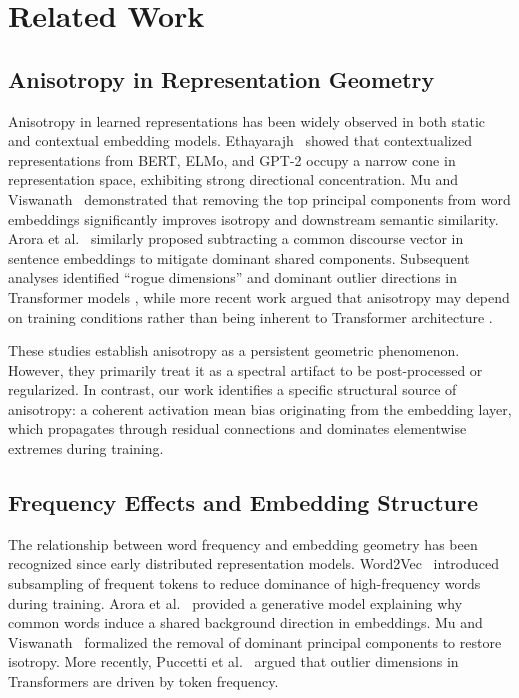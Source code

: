 \section{Related Work}

\subsection{Anisotropy in Representation Geometry}

Anisotropy in learned representations has been widely observed in both static
and contextual embedding models.
Ethayarajh~\cite{ethayarajh2019contextual} showed that contextualized
representations from BERT, ELMo, and GPT-2 occupy a narrow cone in
representation space, exhibiting strong directional concentration.
Mu and Viswanath~\cite{mu2018all,mu2017allbutthetop} demonstrated that
removing the top principal components from word embeddings significantly
improves isotropy and downstream semantic similarity.
Arora et al.~\cite{arora2017simple} similarly proposed subtracting a
common discourse vector in sentence embeddings to mitigate dominant
shared components.
Subsequent analyses identified “rogue dimensions” and dominant outlier
directions in Transformer models
\cite{timkey2021rogue,kovaleva2021bertbusters},
while more recent work argued that anisotropy may depend on training
conditions rather than being inherent to Transformer architecture
\cite{machina2024anisotropy}.

These studies establish anisotropy as a persistent geometric phenomenon.
However, they primarily treat it as a spectral artifact to be post-processed
or regularized.
In contrast, our work identifies a specific structural source of anisotropy:
a coherent activation mean bias originating from the embedding layer,
which propagates through residual connections and dominates elementwise
extremes during training.

\subsection{Frequency Effects and Embedding Structure}

The relationship between word frequency and embedding geometry has been
recognized since early distributed representation models.
Word2Vec~\cite{mikolov2013efficient,mikolov2013distributed}
introduced subsampling of frequent tokens to reduce dominance of high-frequency
words during training.
Arora et al.~\cite{arora2017simple} provided a generative model explaining
why common words induce a shared background direction in embeddings.
Mu and Viswanath~\cite{mu2018all} formalized the removal of dominant principal
components to restore isotropy.
More recently, Puccetti et al.~\cite{puccetti2022frequency}
argued that outlier dimensions in Transformers are driven by token frequency.

